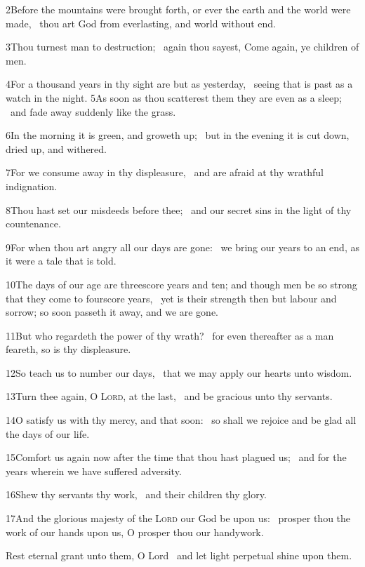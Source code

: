 2\enspace Before the mountains were brought forth, or ever the earth and the world were made, \star\ thou art God from everlasting, and world without end.

3\enspace Thou turnest man to destruction; \star\ again thou sayest, Come again, ye children of men.

4\enspace For a thousand years in thy sight are but as yesterday, \star\ seeing that is past as a watch in the night.
5\enspace As soon as thou scatterest them they are even as a sleep; \star\ and fade away suddenly like the grass.

6\enspace In the morning it is green, and groweth up; \star\ but in the evening it is cut down, dried up, and withered.

7\enspace For we consume away in thy displeasure, \star\ and are afraid at thy wrathful indignation.

8\enspace Thou hast set our misdeeds before thee; \star\ and our secret sins in the light of thy countenance.

9\enspace For when thou art angry all our days are gone: \star\ we bring our years to an end, as it were a tale that is told.

10\enspace The days of our age are threescore years and ten; and though men be so strong that they come to fourscore years, \star\ yet is their strength then but labour and sorrow; so soon passeth it away, and we are gone.

11\enspace But who regardeth the power of thy wrath? \star\ for even thereafter as a man feareth, so is thy displeasure.

12\enspace So teach us to number our days, \star\ that we may apply our hearts unto wisdom.

13\enspace Turn thee again, O {\scshape Lord}, at the last, \star\ and be gracious unto thy servants.

14\enspace O satisfy us with thy mercy, and that soon: \star\ so shall we rejoice and be glad all the days of our life.

15\enspace Comfort us again now after the time that thou hast plagued us; \star\ and for the years wherein we have suffered adversity.

16\enspace Shew thy servants thy work, \star\ and their children thy glory.

17\enspace And the glorious majesty of the {\scshape Lord} our God be upon us: \star\ prosper thou the work of our hands upon us, O prosper thou our handywork.

Rest eternal grant unto them, O Lord \star\ and let light perpetual shine upon them.


